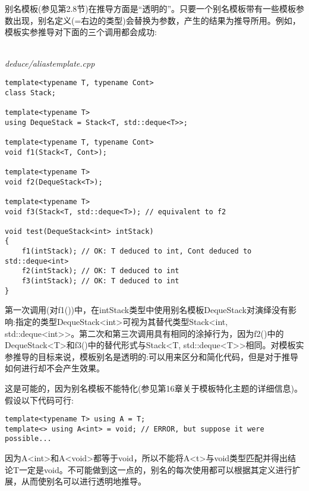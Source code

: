 别名模板(参见第2.8节)在推导方面是“透明的”。只要一个别名模板带有一些模板参数出现，别名定义(=右边的类型)会替换为参数，产生的结果为推导所用。例如，模板实参推导对下面的三个调用都会成功:

\hspace*{\fill} \\ %
\noindent
\textit{deduce/aliastemplate.cpp}
\begin{lstlisting}[style=styleCXX]
template<typename T, typename Cont>
class Stack;

template<typename T>
using DequeStack = Stack<T, std::deque<T>>;

template<typename T, typename Cont>
void f1(Stack<T, Cont>);

template<typename T>
void f2(DequeStack<T>);

template<typename T>
void f3(Stack<T, std::deque<T>); // equivalent to f2

void test(DequeStack<int> intStack)
{
	f1(intStack); // OK: T deduced to int, Cont deduced to std::deque<int>
	f2(intStack); // OK: T deduced to int
	f3(intStack); // OK: T deduced to int
}
\end{lstlisting}

第一次调用(对f1())中，在intStack类型中使用别名模板DequeStack对演绎没有影响:指定的类型DequeStack<int>可视为其替代类型Stack<int, std::deque<int>>。第二次和第三次调用具有相同的涂掉行为，因为f2()中的DequeStack<T>和f3()中的替代形式与Stack<T, std::deque<T>>相同。对模板实参推导的目标来说，模板别名是透明的:可以用来区分和简化代码，但是对于推导如何进行却不会产生效果。

这是可能的，因为别名模板不能特化(参见第16章关于模板特化主题的详细信息)。假设以下代码可行:

\begin{lstlisting}[style=styleCXX]
template<typename T> using A = T;
template<> using A<int> = void; // ERROR, but suppose it were possible...
\end{lstlisting}

因为A<int>和A<void>都等于void，所以不能将A<t>与void类型匹配并得出结论T一定是void。不可能做到这一点的，别名的每次使用都可以根据其定义进行扩展，从而使别名可以进行透明地推导。


























